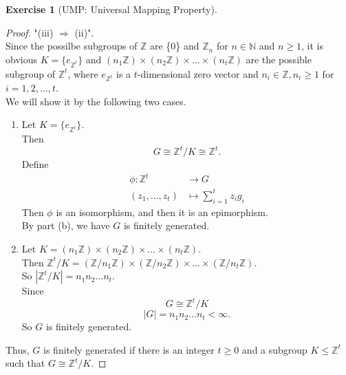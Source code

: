\documentclass{amsart}
\newcommand{\bbz}{\mathbb{Z}}
\newcommand{\bbn}{\mathbb{N}}
\theoremstyle{plain}
\theoremstyle{definition}
\newtheorem{exer}[lem]{Exercise}
\begin{document}
\begin{exer}[UMP: Universal Mapping Property]
\begin{enumerate}[(a)]
\begin{enumerate}[(i)]
\begin{proof}
  	"(iii) $\Rightarrow$ (ii)".\\
  	Since the possilbe subgroups of $\bbz$ are \{0\} and $\bbz_n$ for $ n \in \bbn$ and $n \geq 1$,
  	it is obvious $K = \{e_{\bbz^t}\}$ and $(n_1\bbz)\times (n_2\bbz)\times \ldots \times (n_t\bbz)$ are the possible subgroup of $\bbz^t$, where $e_{\bbz^t}$ is a $t$-dimensional zero vector and $n_i \in \bbz, n_i\geq 1$ for $i=1,2,\ldots,t$.\\
  	We will show it by the following two cases.
  	\begin{enumerate}[(1)]
  		\item
		Let $K=\{e_{\bbz^t}\}$.\\ 
		Then
		\[G \cong \bbz^t/K \cong \bbz^t.\]
		Define
  		\begin{align*}
			\phi: \bbz^t &\to G \\
  		  (z_1,\ldots,z_t) &\mapsto \sum_{i=1}^tz_ig_i 
  		\end{align*}
  		Then $\phi$ is an isomorphism, and then it is an epimorphism.\\
  		By part (b), we have $G$ is finitely generated.\\
		\item
		  Let $K = (n_1\bbz)\times (n_2\bbz)\times \ldots \times (n_t\bbz)$.\\
		  Then $\bbz^t / K = (\bbz/n_1\bbz) \times (\bbz/n_2\bbz)\times \ldots \times (\bbz/n_t\bbz)$.\\
		  So $\left| \bbz^t/K \right| =  n_1n_2 \ldots n_t$.\\
		  Since 
		  \[G \cong \bbz^t/K\]
			\[|G| = n_1n_2\ldots n_t < \infty.\]
		  So $G$ is finitely generated.
	\end{enumerate}
	Thus, $G$ is finitely generated if there is an integer $t\geq 0$ and a subgroup $K\leq\bbz^t$ such that $G\cong\bbz^t/K$.
\end{proof}



\end{enumerate}
\end{enumerate}
\end{exer}
\end{document}

